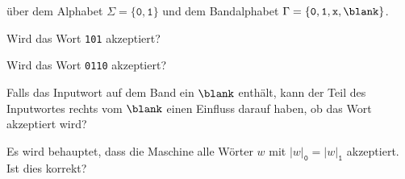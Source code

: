 über dem Alphabet
$\Sigma = \{\texttt{0},\texttt{1}\}$
und dem Bandalphabet
$\Gamma = \{\texttt{0},\texttt{1},\texttt{x},\blank\}$.

\begin{teilaufgaben}
\item Wird das Wort \texttt{101} akzeptiert?
\item Wird das Wort \texttt{0110} akzeptiert?
\item Falls das Inputwort auf dem Band ein $\blank$ enthält, kann der Teil
des Inputwortes 
rechts vom $\blank$ einen Einfluss darauf haben, ob das Wort akzeptiert
wird?
\item
Es wird behauptet, dass die Maschine alle Wörter
$w$ mit $|w|_{\texttt{0}}=|w|_{\texttt{1}}$
akzeptiert.
Ist dies korrekt?
\end{teilaufgaben}


